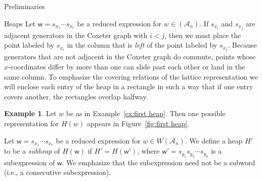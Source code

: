 \documentclass[11pt]{amsart}
\theoremstyle{definition}
\newtheorem{example}[theorem]{Example}
\numberwithin{equation}{section}
\newcommand{\A}{\mathcal{A}}
\renewcommand{\L}{\mathcal{L}}
\renewcommand{\(}{\left(}
\renewcommand{\)}{\right)}
\newcommand{\w}{\mathsf{w}}
\DeclareMathOperator{\FC}{FC}
\begin{document}
\begin{section}{Preliminaries}
\begin{subsection}{Heaps}
Let $\w=s_{x_1}\cdots s_{x_r}$ be a reduced expression for $w \in (\A_{n})$.  If $s_{x_i}$ and $s_{x_j}$ are adjacent generators in the Coxeter graph with $i<j$, then we must place the point labeled by $s_{x_i}$ in the column that is \emph{left} of the point labeled by $s_{x_j}$.  Because generators that are not adjacent in the Coxeter graph do commute, points whose $x$-coordinates differ by more than one can slide past each other or land in the same column.  To emphasize the covering relations of the lattice representation we will enclose each entry of the heap in a rectangle in such a way that if one entry covers another, the rectangles overlap halfway.

\begin{example}\label{ex:second heap}
Let $w$ be as in Example~\ref{ex:first heap}.  Then one possible representation for $H(w)$ appears in Figure~\ref{fig:first heap}.
\end{example}



Let $\w=s_{x_{1}} \cdots s_{x_{r}}$ be a reduced expression for $w \in W(\A_{n})$.  We define a heap $H'$ to be a \emph{subheap} of $H(\w)$ if $H'=H(\w')$, where $\w'=s_{y_1}s_{y_2} \cdots s_{y_k}$ is a subexpression of $\w$.  We emphasize that the subexpression need not be a subword (i.e., a consecutive subexpression).


\end{subsection}
\end{section}
\end{document}
